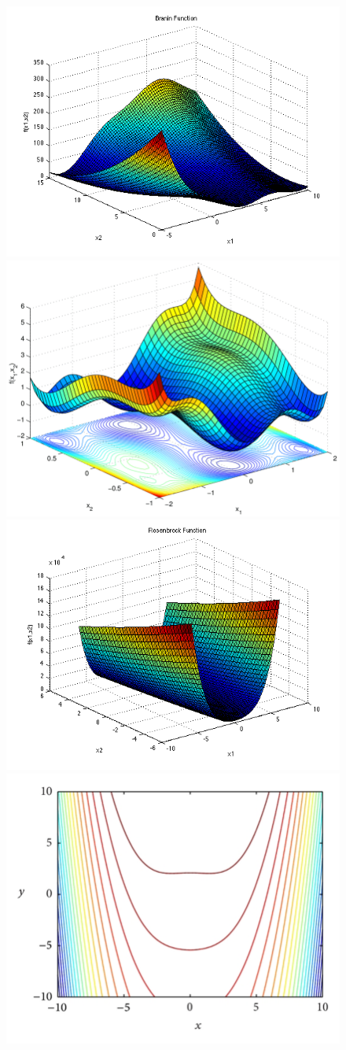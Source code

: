 \documentclass[12pt,fleqn]{article}
\begin{document}
	\begin{figure}[!h]
		\centering
		\includegraphics[width=0.5\linewidth]{test_functions/Branin.png}\includegraphics[width=0.5\linewidth]{test_functions/SixHump.png}
		\includegraphics[width=0.5\linewidth]{test_functions/Rosenbrock.png}\includegraphics[width=0.5\linewidth]{test_functions/Colville.png}

\end{figure}
\end{document}
